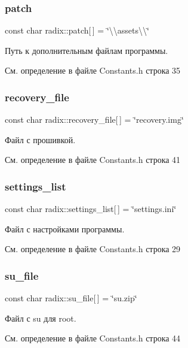 \subsubsection{\texorpdfstring{patch}{patch}}
{\footnotesize\ttfamily const char radix\+::patch\mbox{[}$\,$\mbox{]} = \char`\"{}\textbackslash{}\textbackslash{}assets\textbackslash{}\textbackslash{}\char`\"{}}

Путь к дополнительным файлам программы. 

См. определение в файле Constants.\+h строка 35

\mbox{\label{namespaceradix_a91c21d6be385236a564ef5bf1f3f3602}} 
\subsubsection{\texorpdfstring{recovery\+\_\+file}{recovery\_file}}
{\footnotesize\ttfamily const char radix\+::recovery\+\_\+file\mbox{[}$\,$\mbox{]} = \char`\"{}recovery.\+img\char`\"{}}

Файл с прошивкой. 

См. определение в файле Constants.\+h строка 41

\mbox{\label{namespaceradix_a43bff57dbd1b7dcebee0228ccbab7f17}} 
\subsubsection{\texorpdfstring{settings\+\_\+list}{settings\_list}}
{\footnotesize\ttfamily const char radix\+::settings\+\_\+list\mbox{[}$\,$\mbox{]} = \char`\"{}settings.\+ini\char`\"{}}

Файл с настройками программы. 

См. определение в файле Constants.\+h строка 29

\mbox{\label{namespaceradix_abcd4cb3ab01a6a642ba224e2d9b1eda5}} 
\subsubsection{\texorpdfstring{su\+\_\+file}{su\_file}}
{\footnotesize\ttfamily const char radix\+::su\+\_\+file\mbox{[}$\,$\mbox{]} = \char`\"{}su.\+zip\char`\"{}}

Файл с su для root. 

См. определение в файле Constants.\+h строка 44

